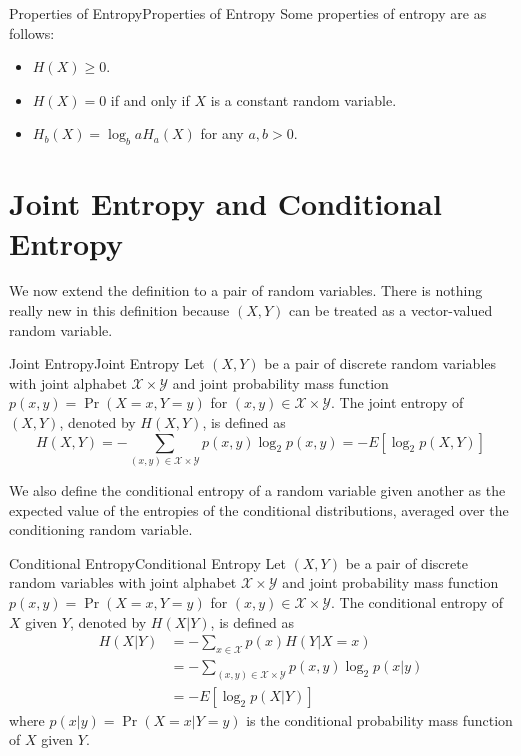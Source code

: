 \documentclass[../main.tex]{subfiles}
\begin{document}
\begin{proposition}{Properties of Entropy}{Properties of Entropy}
  Some properties of entropy are as follows:
  \begin{itemize}
    \item $H(X) \geq 0$.
    \item $H(X) = 0$ if and only if $X$ is a constant random variable.
    \item $H_b(X) = \log_b a H_a(X)$ for any $a,b > 0$.
  \end{itemize}
\end{proposition}

\section{Joint Entropy and Conditional Entropy}
We now extend the definition to a pair of random variables. There is nothing really new in this definition because $(X,Y)$ can be treated as a vector-valued random variable.

\begin{definition}{Joint Entropy}{Joint Entropy}
  Let $(X,Y)$ be a pair of discrete random variables with joint alphabet $\mathcal{X} \times \mathcal{Y}$ and joint probability mass function $p(x,y) = \Pr(X=x,Y=y)$ for $(x,y) \in \mathcal{X} \times \mathcal{Y}$. The joint entropy of $(X,Y)$, denoted by $H(X,Y)$, is defined as
  \begin{equation}
    H(X,Y) = -\sum_{(x,y) \in \mathcal{X} \times \mathcal{Y}} p(x,y) \log_2 p(x,y) = -E[\log_2 p(X,Y)]
  \end{equation}
\end{definition}

We also define the conditional entropy of a random variable given another as the expected value of the entropies of the conditional distributions, averaged over the conditioning random variable.

\begin{definition}{Conditional Entropy}{Conditional Entropy}
  Let $(X,Y)$ be a pair of discrete random variables with joint alphabet $\mathcal{X} \times \mathcal{Y}$ and joint probability mass function $p(x,y) = \Pr(X=x,Y=y)$ for $(x,y) \in \mathcal{X} \times \mathcal{Y}$. The conditional entropy of $X$ given $Y$, denoted by $H(X|Y)$, is defined as
  \begin{equation}
    \begin{aligned}
      H(X|Y) &= -\sum_{x \in \mathcal{X}} p(x) H(Y|X=x)\\
             &= -\sum_{(x,y) \in \mathcal{X} \times \mathcal{Y}} p(x,y) \log_2 p(x|y)\\
             &= -E[\log_2 p(X|Y)]
    \end{aligned}
  \end{equation}
  where $p(x|y) = \Pr(X=x|Y=y)$ is the conditional probability mass function of $X$ given $Y$.
\end{definition}
\end{document}
